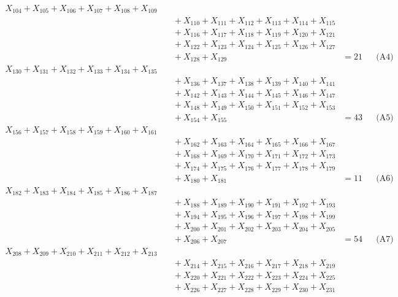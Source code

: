 \documentclass[a4paper,10pt]{article}
\begin{document}
{\begin{align}
X_{104} + X_{105} + X_{106} + X_{107} + X_{108} + X_{109} \\[0.5ex]
&\quad  + X_{110} + X_{111} + X_{112} + X_{113} + X_{114} + X_{115} \\[0.5ex]
&\quad  + X_{116} + X_{117} + X_{118} + X_{119} + X_{120} + X_{121} \\[0.5ex]
&\quad  + X_{122} + X_{123} + X_{124} + X_{125} + X_{126} + X_{127} \\[0.5ex]
&\quad  + X_{128} + X_{129} &= 21 && \text{(A4)} \\
X_{130} + X_{131} + X_{132} + X_{133} + X_{134} + X_{135} \\[0.5ex]
&\quad  + X_{136} + X_{137} + X_{138} + X_{139} + X_{140} + X_{141} \\[0.5ex]
&\quad  + X_{142} + X_{143} + X_{144} + X_{145} + X_{146} + X_{147} \\[0.5ex]
&\quad  + X_{148} + X_{149} + X_{150} + X_{151} + X_{152} + X_{153} \\[0.5ex]
&\quad  + X_{154} + X_{155} &= 43 && \text{(A5)} \\
X_{156} + X_{157} + X_{158} + X_{159} + X_{160} + X_{161} \\[0.5ex]
&\quad  + X_{162} + X_{163} + X_{164} + X_{165} + X_{166} + X_{167} \\[0.5ex]
&\quad  + X_{168} + X_{169} + X_{170} + X_{171} + X_{172} + X_{173} \\[0.5ex]
&\quad  + X_{174} + X_{175} + X_{176} + X_{177} + X_{178} + X_{179} \\[0.5ex]
&\quad  + X_{180} + X_{181} &= 11 && \text{(A6)} \\
X_{182} + X_{183} + X_{184} + X_{185} + X_{186} + X_{187} \\[0.5ex]
&\quad  + X_{188} + X_{189} + X_{190} + X_{191} + X_{192} + X_{193} \\[0.5ex]
&\quad  + X_{194} + X_{195} + X_{196} + X_{197} + X_{198} + X_{199} \\[0.5ex]
&\quad  + X_{200} + X_{201} + X_{202} + X_{203} + X_{204} + X_{205} \\[0.5ex]
&\quad  + X_{206} + X_{207} &= 54 && \text{(A7)} \\
X_{208} + X_{209} + X_{210} + X_{211} + X_{212} + X_{213} \\[0.5ex]
&\quad  + X_{214} + X_{215} + X_{216} + X_{217} + X_{218} + X_{219} \\[0.5ex]
&\quad  + X_{220} + X_{221} + X_{222} + X_{223} + X_{224} + X_{225} \\[0.5ex]
&\quad  + X_{226} + X_{227} + X_{228} + X_{229} + X_{230} + X_{231} \\[0.5ex]

\end{align}}
\end{document}
